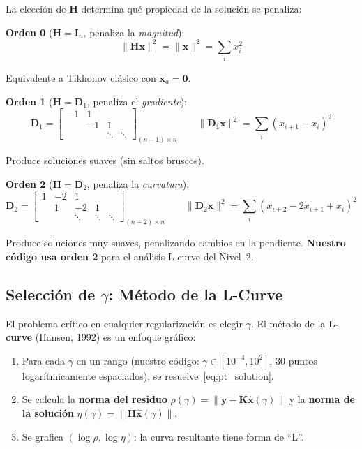 \documentclass[a4paper,11pt]{article}
\begin{document}
La elecci\'on de $\mathbf{H}$ determina qu\'e propiedad de la soluci\'on se
penaliza:

\textbf{Orden 0} ($\mathbf{H} = \mathbf{I}_n$, penaliza la \emph{magnitud}):
\begin{equation}
    \|\mathbf{H}\mathbf{x}\|^2 = \|\mathbf{x}\|^2 = \sum_i x_i^2
\end{equation}

Equivalente a Tikhonov cl\'asico con $\mathbf{x}_a = \mathbf{0}$.

\textbf{Orden 1} ($\mathbf{H} = \mathbf{D}_1$, penaliza el \emph{gradiente}):
\begin{equation}
    \mathbf{D}_1 = \begin{bmatrix}
        -1 & 1 & & \\
        & -1 & 1 & \\
        & & \ddots & \ddots
    \end{bmatrix}_{(n-1)\times n}
    \qquad
    \|\mathbf{D}_1\mathbf{x}\|^2 = \sum_i (x_{i+1}-x_i)^2
\end{equation}

Produce soluciones suaves (sin saltos bruscos).

\textbf{Orden 2} ($\mathbf{H} = \mathbf{D}_2$, penaliza la \emph{curvatura}):
\begin{equation}
    \mathbf{D}_2 = \begin{bmatrix}
        1 & -2 & 1 & & \\
        & 1 & -2 & 1 & \\
        & & \ddots & \ddots & \ddots
    \end{bmatrix}_{(n-2)\times n}
    \qquad
    \|\mathbf{D}_2\mathbf{x}\|^2 = \sum_i (x_{i+2}-2x_{i+1}+x_i)^2
\end{equation}

Produce soluciones muy suaves, penalizando cambios en la pendiente.
\textbf{Nuestro c\'odigo usa orden 2} para el an\'alisis L-curve del Nivel~2.

\subsection{Selecci\'on de $\gamma$: M\'etodo de la L-Curve}

El problema cr\'itico en cualquier regularizaci\'on es elegir $\gamma$.
El m\'etodo de la \textbf{L-curve} (Hansen, 1992) es un enfoque gr\'afico:
\begin{enumerate}
    \item Para cada $\gamma$ en un rango (nuestro c\'odigo:
          $\gamma \in [10^{-4}, 10^2]$, 30 puntos logar\'itmicamente
          espaciados), se resuelve~\eqref{eq:pt_solution}.
    \item Se calcula la \textbf{norma del residuo}
          $\rho(\gamma) = \|\mathbf{y}-\mathbf{K}\hat{\mathbf{x}}(\gamma)\|$
          y la \textbf{norma de la soluci\'on}
          $\eta(\gamma) = \|\mathbf{H}\hat{\mathbf{x}}(\gamma)\|$.
    \item Se grafica $(\log\rho, \log\eta)$: la curva resultante tiene forma
          de ``L''.
\end{enumerate}
\end{document}
